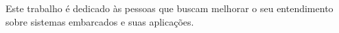 Este trabalho é dedicado às pessoas que buscam melhorar o seu entendimento sobre sistemas embarcados e suas aplicações.